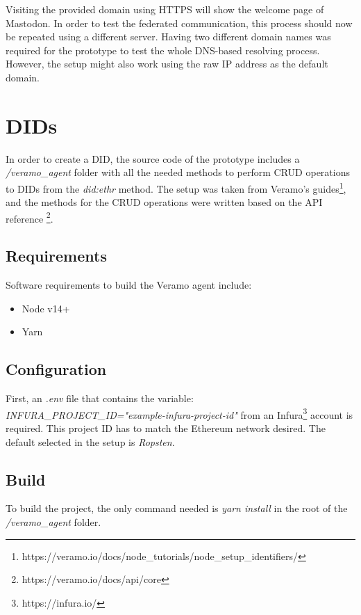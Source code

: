 Visiting the provided domain using HTTPS will show the welcome page of Mastodon. In order to test the federated communication, this process should now be repeated using a different server. Having two different domain names was required for the prototype to test the whole DNS-based resolving process. However, the setup might also work using the raw IP address as the default domain. 


\section{DIDs}

In order to create a DID, the source code of the prototype includes a \emph{/veramo\_agent} folder with all the needed methods to perform CRUD operations to DIDs from the \emph{did:ethr} method. The setup was taken from Veramo's guides\footnote{https://veramo.io/docs/node\_tutorials/node\_setup\_identifiers/}, and the methods for the CRUD operations were written based on the API reference \footnote{https://veramo.io/docs/api/core}. 

\subsection{Requirements}

Software requirements to build the Veramo agent include: 
\begin{itemize}
  \item Node v14+
  \item Yarn
\end{itemize}

\subsection{Configuration}
First, an \emph{.env} file that contains the variable: \emph{INFURA\_PROJECT\_ID="example-infura-project-id"} from an Infura\footnote{https://infura.io/} account is required. This project ID has to match the Ethereum network desired. The default selected in the setup is \emph{Ropsten}.

\subsection{Build}
To build the project, the only command needed is \emph{yarn install} in the root of the \emph{/veramo\_agent} folder. 

